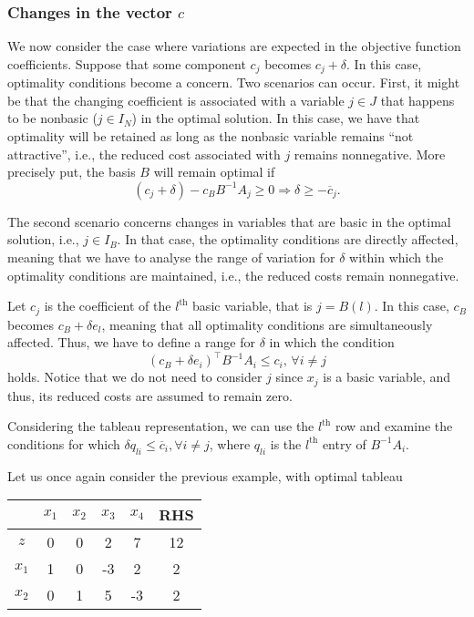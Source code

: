 \subsubsection{Changes in the vector $c$}

We now consider the case where variations are expected in the objective function coefficients. Suppose that some component $c_j$ becomes $c_j + \delta$. In this case, optimality conditions become a concern. Two scenarios can occur. First, it might be that the changing coefficient is associated with a variable $j \in J$ that happens to be nonbasic ($j \in I_N$) in the optimal solution. In this case, we have that optimality will be retained as long as the nonbasic variable remains ``not attractive'', i.e., the reduced cost associated with $j$ remains nonnegative. More precisely put, the basis $B$ will remain optimal if
%
\begin{equation*}
	(c_j + \delta) - c_BB^{-1}A_j \geq 0 \Rightarrow \delta \geq -\overline{c}_j.
\end{equation*}
%

The second scenario concerns changes in variables that are basic in the optimal solution, i.e., $j \in I_B$. In that case, the optimality conditions are directly affected, meaning that we have to analyse the range of variation for $\delta$ within which the optimality conditions are maintained, i.e., the reduced costs remain nonnegative.

Let $c_j$ is the coefficient of the $l^{\text{th}}$ basic variable, that is $j = B(l)$. In this case, $c_B$ becomes $c_B + \delta e_l$, meaning that all optimality conditions are simultaneously affected. Thus, we have to define a range for $\delta$ in which the condition
%
\begin{equation*}
	(c_B + \delta e_i)^\top B^{-1}A_i \leq c_i, \, \forall i \neq j 
\end{equation*}
%
holds. Notice that we do not need to consider $j$ since $x_j$ is a basic variable, and thus, its reduced costs are assumed to remain zero.

Considering the tableau representation, we can use the $l^{\text{th}}$ row and examine the conditions for which $\delta q_{li} \leq \overline{c}_i, \forall i \neq j$, where $q_{li}$ is the $l^{\text{th}}$ entry of $B^{-1}A_i$.

Let us once again consider the previous example, with optimal tableau 

\begin{center}
	\begin{tabular}{c|cccc|c} 
	   &$x_1$ & $x_2$ & $x_3$ & $x_4$& RHS \\ \hline	
	   $z$ & 0 & 0 & 2 & 7 & 12\\
	   $x_1$ & 1 & 0 & -3 & 2 & 2\\
	   $x_2$ & 0 & 1 & 5 & -3 & 2\\	            
	\end{tabular}	
\end{center}

